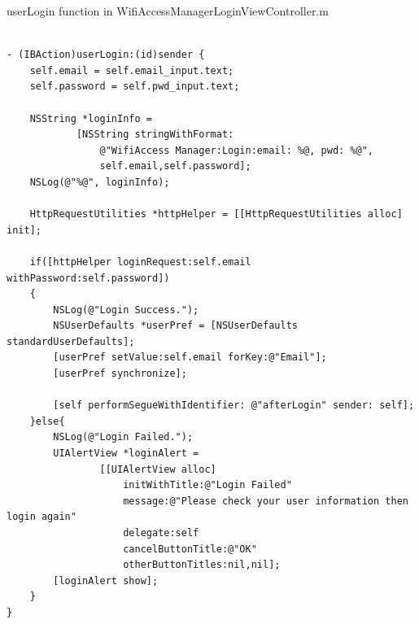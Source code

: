 \begin{algorithm}[h]
  \caption{userLogin function in WifiAccessManagerLoginViewController.m}
  \label{code:ios_userlogin}
  \begin{verbatim}
  
- (IBAction)userLogin:(id)sender {
    self.email = self.email_input.text;
    self.password = self.pwd_input.text;
    
    NSString *loginInfo = 
    		[NSString stringWithFormat:
    			@"WifiAccess Manager:Login:email: %@, pwd: %@",
    			self.email,self.password];
    NSLog(@"%@", loginInfo);
    
    HttpRequestUtilities *httpHelper = [[HttpRequestUtilities alloc] init];
    
    if([httpHelper loginRequest:self.email withPassword:self.password])
    {
        NSLog(@"Login Success.");
        NSUserDefaults *userPref = [NSUserDefaults standardUserDefaults];
        [userPref setValue:self.email forKey:@"Email"];
        [userPref synchronize];
        
        [self performSegueWithIdentifier: @"afterLogin" sender: self];
    }else{
        NSLog(@"Login Failed.");
        UIAlertView *loginAlert = 
        		[[UIAlertView alloc] 
        			initWithTitle:@"Login Failed" 
        			message:@"Please check your user information then login again" 
        			delegate:self 
        			cancelButtonTitle:@"OK" 
        			otherButtonTitles:nil,nil];
        [loginAlert show];
    }
}

 \end{verbatim}
\end{algorithm}

